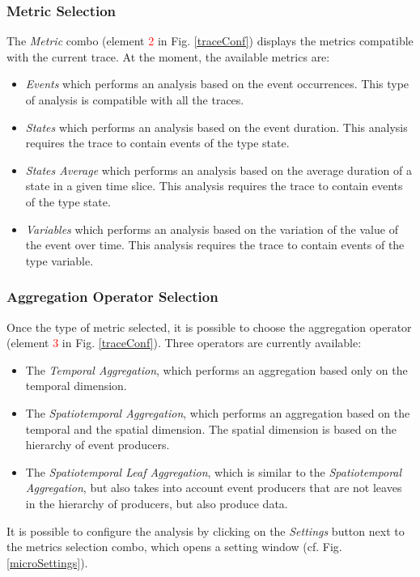 \documentclass[twoside]{article}
\begin{document}
\begin{sloppypar}
\subsubsection{Metric Selection}
The \textit{Metric} combo (element \textcolor{red}{2} in Fig. \ref{traceConf}) displays the metrics compatible with the current trace.
At the moment, the available metrics are: 
\begin{itemize}
	\item \textit{Events} which performs an analysis based on the event occurrences. This type of analysis is compatible with all the traces.
	\item \textit{States} which performs an analysis based on the event duration. This analysis requires the trace to contain events of the type state.
	\item \textit{States Average} which performs an analysis based on the average duration of a state in a given time slice. This analysis requires the trace to contain events of the type state.
	\item \textit{Variables} which performs an analysis based on the variation of the value of the event over time. This analysis requires the trace to contain events of the type variable.
\end{itemize}

\subsubsection{Aggregation Operator Selection}
Once the type of metric selected, it is possible to choose the aggregation operator (element \textcolor{red}{3} in Fig. \ref{traceConf}). Three operators are currently available:
\begin{itemize}
	\item The \textit{Temporal Aggregation}, which performs an aggregation based only on the temporal dimension.
	\item The \textit{Spatiotemporal Aggregation}, which performs an aggregation based on the temporal and the spatial dimension. The spatial dimension is based on the hierarchy of event producers.
	\item The \textit{Spatiotemporal Leaf Aggregation}, which is similar to the \emph{Spatiotemporal Aggregation}, but also takes into account event producers that are not leaves in the hierarchy of producers, but also produce data.
\end{itemize}

It is possible to configure the analysis by clicking on the \textit{Settings} button next to the metrics selection combo, which opens a setting window (cf. Fig. \ref{microSettings}).


\end{sloppypar}
\end{document}
